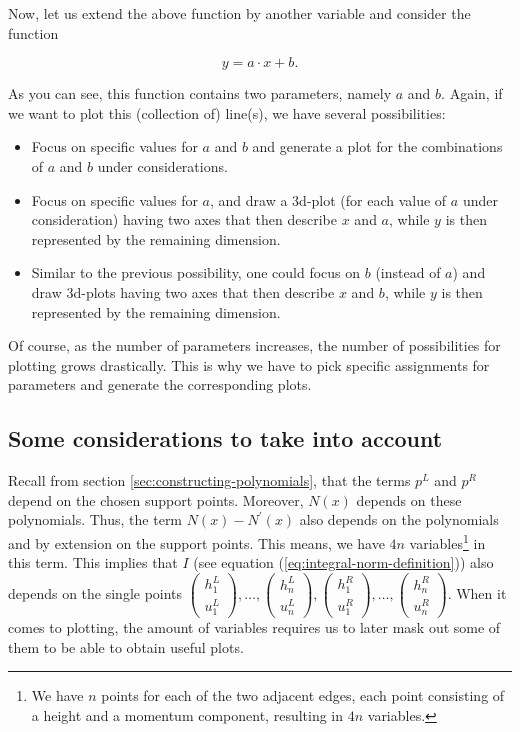 \documentclass{article}
\begin{document}
Now, let us extend the above function by another variable and consider the function

\begin{equation*}
  y = a\cdot x+b.
\end{equation*}

As you can see, this function contains two parameters, namely $a$ and $b$. Again, if we want to plot this (collection of) line(s), we have several possibilities:

\begin{itemize}
\item Focus on specific values for $a$ and $b$ and generate a plot for the combinations of $a$ and $b$ under considerations.
\item Focus on specific values for $a$, and draw a 3d-plot (for each value of $a$ under consideration) having two axes that then describe $x$ and $a$, while $y$ is then represented by the remaining dimension.
\item Similar to the previous possibility, one could focus on $b$ (instead of $a$) and draw 3d-plots having two axes that then describe $x$ and $b$, while $y$ is then represented by the remaining dimension.
\end{itemize}

Of course, as the number of parameters increases, the number of possibilities for plotting grows drastically. This is why we have to pick specific assignments for parameters and generate the corresponding plots.

\subsection{Some considerations to take into account}
\label{sec:some-considerations}

Recall from section \ref{sec:constructing-polynomials}, that the terms $p^L$ and $p^R$ depend on the chosen support points. Moreover, $N\left(x\right)$ depends on these polynomials. Thus, the term $N\left(x\right)-N^\prime\left(x\right)$ also depends on the polynomials and by extension on the support points. This means, we have $4n$ variables\footnote{We have $n$ points for each of the two adjacent edges, each point consisting of a height and a momentum component, resulting in $4n$ variables.} in this term.
This implies that $I$ (see equation (\ref{eq:integral-norm-definition})) also depends on the single points $
\begin{pmatrix}
  h_1^L \\ u_1^L
\end{pmatrix},\dots,
\begin{pmatrix}
  h_n^L \\ u_n^L
\end{pmatrix},
\begin{pmatrix}
  h_1^R \\ u_1^R
\end{pmatrix},\dots,
\begin{pmatrix}
  h_n^R \\ u_n^R
\end{pmatrix}$. When it comes to plotting, the amount of variables requires us to later mask out some of them to be able to obtain useful plots.
\end{document}
